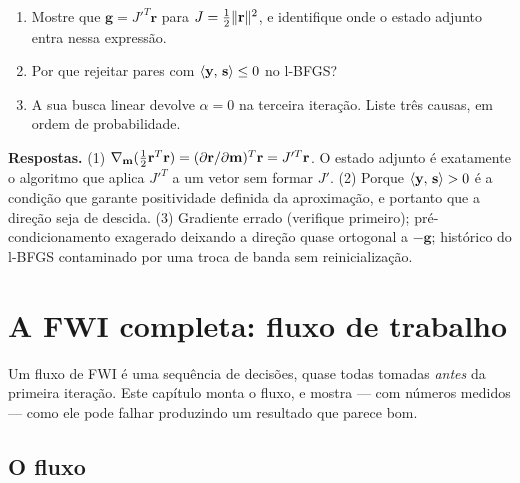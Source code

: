 \documentclass[11pt,a4paper,oneside]{report}
\begin{document}
\begin{exercicio}
\begin{enumerate}[leftmargin=*, itemsep=2pt]
\item Mostre que $\mathbf{g} = J'^{T}\mathbf{r}$ para
$J = \tfrac12\lVert \mathbf{r} \rVert^{2}$, e identifique onde o estado adjunto
entra nessa express\~ao.
\item Por que rejeitar pares com $\langle \mathbf{y},\,\mathbf{s}\rangle \le 0$ no
l-BFGS?
\item A sua busca linear devolve $\alpha = 0$ na terceira itera\c{c}\~ao. Liste
tr\^es causas, em ordem de probabilidade.
\end{enumerate}
\textbf{Respostas.} (1) $\nabla_{\mathbf{m}}(\tfrac12\mathbf{r}^{T}\mathbf{r})
= (\partial\mathbf{r}/\partial\mathbf{m})^{T}\mathbf{r} = J'^{T}\mathbf{r}$. O
estado adjunto \'e exatamente o algoritmo que aplica $J'^{T}$ a um vetor sem
formar $J'$. (2) Porque $\langle \mathbf{y},\,\mathbf{s}\rangle > 0$ \'e a
condi\c{c}\~ao que garante positividade definida da aproxima\c{c}\~ao, e
portanto que a dire\c{c}\~ao seja de descida. (3) Gradiente errado (verifique
primeiro); pr\'e-condicionamento exagerado deixando a dire\c{c}\~ao quase
ortogonal a $-\mathbf{g}$; hist\'orico do l-BFGS contaminado por uma troca de
banda sem reinicializa\c{c}\~ao.
\end{exercicio}

\chapter{A FWI completa: fluxo de trabalho}
\label{cap:completa}

\begin{ideia}
Um fluxo de FWI \'e uma sequ\^encia de decis\~oes, quase todas tomadas
\emph{antes} da primeira itera\c{c}\~ao. Este cap\'itulo monta o fluxo, e
mostra --- com n\'umeros medidos --- como ele pode falhar produzindo um
resultado que parece bom.
\end{ideia}

\section{O fluxo}
\end{document}
